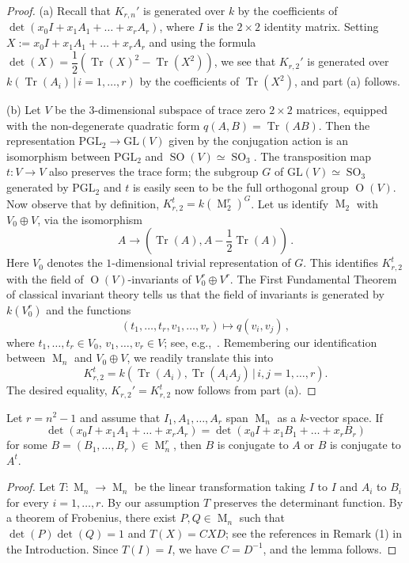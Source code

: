 \documentclass[12pt]{amsart}
\numberwithin{equation}{section}
\numberwithin{subsection}{section}
\theoremstyle{definition} \newtheorem{definition}[theorem]{Definition}
\newcommand{\GL}{\mathrm{GL}} \newcommand{\Ima}{\operatorname{Im}}
\newcommand{\PGL}{\mathrm{PGL}}
\newcommand{\tr}{\operatorname{Tr}}
\newcommand{\SO}{\operatorname{SO}}
\newcommand{\Orth}{\operatorname{O}}
\newcommand{\Mat}{\operatorname{M}}
\begin{document}
\begin{proof} (a) Recall that  
$K_{r, n}'$ is generated over $k$ by the coefficients of 
$\det(x_0 I + x_1 A_1 + \dots + x_r A_r)$, where $I$ is the $2 \times 2$ 
identity matrix.
Setting $X := x_0I + x_1 A_1 + \dots + x_r A_r$ and
using the formula $\det(X) = \dfrac{1}{2}(\tr(X)^2 - \tr(X^2))$, we 
see that $K_{r, 2}'$ is generated over $k(\tr(A_i) \, | \, i = 1, \dots, r)$
by the coefficients of $\tr(X^2)$, and part (a) follows.

(b) Let $V$ be the $3$-dimensional subspace of trace zero $2 \times 2$ 
matrices, equipped with the non-degenerate quadratic form $q(A, B) = \tr(AB)$.
Then the representation $\PGL_2 \to \GL(V)$ given by the conjugation
action is an isomorphism between $\PGL_2$ and $\SO(V) \simeq \SO_3$.
The transposition map $t \colon V \to V$ also preserves 
the trace form;
the subgroup $G$ of $\GL(V) \simeq \SO_3$ generated by 
$\PGL_2$ and $t$ is easily seen to be the full orthogonal group
$\Orth(V)$. 
Now observe that by definition,
$K_{r, 2}^t = k(\Mat_2^r)^G$. Let us identify
$\Mat_2$ with $V_0 \oplus V$, via the isomorphism
\[ A \to (\tr(A), A - \frac{1}{2} \tr(A)) \, . \] 
Here $V_0$ denotes the $1$-dimensional
trivial representation of $G$. 
This identifies $K_{r, 2}^{t}$ 
with the field of $\Orth(V)$-invariants of 
$V_0^r \oplus V^r$.  The First Fundamental Theorem of classical 
invariant theory tells us that the field of invariants 
is generated by $k(V_0^r)$ and the functions
\[ (t_1, \dots, t_r, v_1, \dots, v_r) \mapsto q(v_i, v_j) \, , \]
where $t_1, \dots, t_r \in V_0$, $v_1, \dots, v_r \in V$; see, 
e.g.,~\cite[Theorem 5.7]{dCP}.  Remembering
our identification between $\Mat_n$ and $V_0 \oplus V$, 
we readily translate this into
\[ K_{r, 2}^t = k(\tr(A_i), \tr(A_i A_j) \, | \, i, j = 1, \dots, r). \]
The desired equality, $K_{r, 2}' = K_{r, 2}^t$ now follows from part (a).
\end{proof}

\begin{lemma} \label{lem.frobenius} Let $r = n^2 - 1$ and assume that
$I_1, A_1, \dots, A_r$ span $\Mat_n$ as a $k$-vector space. If 
\[ \det(x_0 I + x_1 A_1 + \dots + x_r A_r) = 
\det(x_0 I + x_1 B_1 + \dots + x_r B_r) \]
for some $B = (B_1, \dots, B_r) \in \Mat_n^r$, then $B$ is conjugate to
$A$ or $B$ is conjugate to $A^t$.
\end{lemma}

\begin{proof} Let $T \colon \Mat_n \to \Mat_n$ be the linear transformation
taking $I$ to $I$ and $A_i$ to $B_i$ for every $i = 1, \dots, r$. 
By our assumption $T$ preserves the determinant function. By a theorem
of Frobenius, there exist $P, Q \in \Mat_n$ such that $\det(P) \det(Q) = 1$
and  $T(X) = C X D$; see the references in Remark (1) in the Introduction.
Since $T(I) = I$, we have $C = D^{-1}$, and the lemma follows.
\end{proof}
\end{document}
